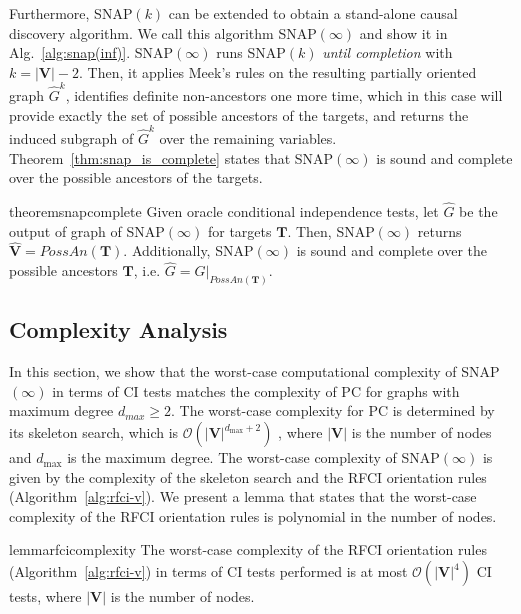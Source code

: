 Furthermore, \ac{SNAP}$(k)$ can be extended to obtain a stand-alone causal discovery algorithm.
We call this algorithm \ac{SNAP}$(\infty)$ and show it in Alg.~\ref{alg:snap(inf)}.
\ac{SNAP}$(\infty)$ runs \ac{SNAP}$(k)$ \emph{until completion} with $k=|\mathbf{V}|-2$.
Then, it applies Meek's rules on the resulting partially oriented graph $\hat{G}^k$, identifies definite non-ancestors one more time, which in this case will provide exactly the set of possible ancestors of the targets, and returns the induced subgraph of $\hat{G}^k$ over the remaining variables.
Theorem~\ref{thm:snap_is_complete} states that \ac{SNAP}$(\infty)$ is sound and complete over the possible ancestors of the targets.

\begin{restatable}[]{theorem}{snapcomplete}
\label{thm:snap_is_complete}
Given oracle conditional independence tests, let $\hat{G}$ be the output of graph of \ac{SNAP}$(\infty)$ for targets $\mathbf{T}$. Then, \ac{SNAP}$(\infty)$ returns $\mathbf{\hat{V}} = PossAn(\mathbf{T})$. Additionally, \ac{SNAP}$(\infty)$ is sound and complete over the possible ancestors $\mathbf{T}$, i.e.
$
\hat{G} = G|_{PossAn(\mathbf{T})}.
$
\end{restatable}

\subsection{Complexity Analysis}

In this section, we show that the worst-case computational complexity of \ac{SNAP}$(\infty)$ in terms of \ac{CI} tests matches the complexity of PC
for graphs with maximum degree $d_{max} \geq 2$.
The worst-case complexity for PC is determined by its skeleton search, which is $\mathcal{O}(|\mathbf{V}|^{d_{\max}+2})$ \citep{spirtes2000causation}, where $|\mathbf{V}|$ is the number of nodes and $d_{\max}$ is the maximum degree.
The worst-case complexity of \ac{SNAP}$(\infty)$ is given by the complexity of the skeleton search and the RFCI orientation rules (Algorithm~\ref{alg:rfci-v}).
We present a lemma that states that the worst-case complexity of the RFCI orientation rules is polynomial in the number of nodes.

\begin{restatable}[]{lemma}{rfcicomplexity}
\label{lem:rfci_complexity}
The worst-case complexity of the RFCI orientation rules (Algorithm~\ref{alg:rfci-v}) in terms of \ac{CI} tests performed is at most $\mathcal{O}(|\mathbf{V}|^4)$ \ac{CI} tests, where $|\mathbf{V}|$ is the number of nodes.
\end{restatable}


